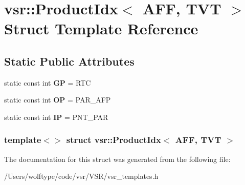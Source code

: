 \hypertarget{structvsr_1_1_product_idx_3_01_a_f_f_00_01_t_v_t_01_4}{\section{vsr\-:\-:Product\-Idx$<$ A\-F\-F, T\-V\-T $>$ Struct Template Reference}
\label{structvsr_1_1_product_idx_3_01_a_f_f_00_01_t_v_t_01_4}
}
\subsection*{Static Public Attributes}
\begin{DoxyCompactItemize}
\item 
\hypertarget{structvsr_1_1_product_idx_3_01_a_f_f_00_01_t_v_t_01_4_a896374128701c1e743310fe895a9ca7c}{static const int {\bfseries G\-P} = R\-T\-C}\label{structvsr_1_1_product_idx_3_01_a_f_f_00_01_t_v_t_01_4_a896374128701c1e743310fe895a9ca7c}

\item 
\hypertarget{structvsr_1_1_product_idx_3_01_a_f_f_00_01_t_v_t_01_4_a3140d61a5413fef548a4076e0ec0b54f}{static const int {\bfseries O\-P} = P\-A\-R\-\_\-\-A\-F\-P}\label{structvsr_1_1_product_idx_3_01_a_f_f_00_01_t_v_t_01_4_a3140d61a5413fef548a4076e0ec0b54f}

\item 
\hypertarget{structvsr_1_1_product_idx_3_01_a_f_f_00_01_t_v_t_01_4_a3b8ded3e5193f28fc914925c3ba7a4bb}{static const int {\bfseries I\-P} = P\-N\-T\-\_\-\-P\-A\-R}\label{structvsr_1_1_product_idx_3_01_a_f_f_00_01_t_v_t_01_4_a3b8ded3e5193f28fc914925c3ba7a4bb}

\end{DoxyCompactItemize}
\subsubsection*{template$<$$>$ struct vsr\-::\-Product\-Idx$<$ A\-F\-F, T\-V\-T $>$}



The documentation for this struct was generated from the following file\-:\begin{DoxyCompactItemize}
\item 
/\-Users/wolftype/code/vsr/\-V\-S\-R/vsr\-\_\-templates.\-h\end{DoxyCompactItemize}
